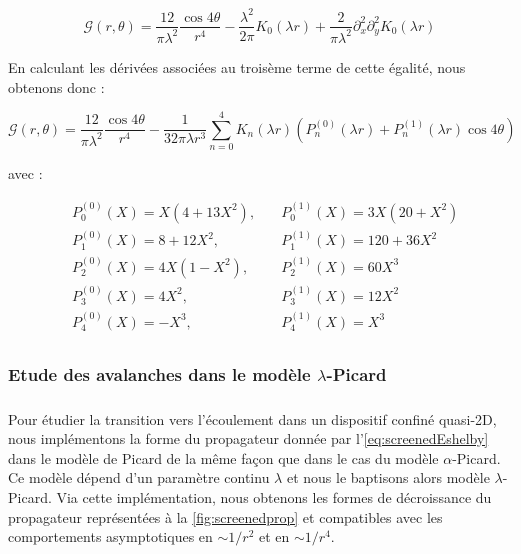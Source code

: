 \begin{equation}
    \mathcal{G}(r,\theta) = \frac{12}{\pi\lambda^2}\frac{\cos 4\theta}{r^4}-\frac{\lambda^2}{2\pi}K_0(\lambda r)+\frac{2}{\pi\lambda^2}\partial_x^2\partial_y^2K_0(\lambda r)
\end{equation}

\noindent En calculant les dérivées associées au troisème terme de cette égalité, nous obtenons donc :

\begin{equation}
    \mathcal{G}(r,\theta) = \frac{12}{\pi\lambda^2}\frac{\cos 4\theta}{r^4} - \frac{1}{32\pi\lambda r^3}\sum_{n=0}^{4}K_n(\lambda r)\left(P_n^{(0)}(\lambda r) + P_n^{(1)}(\lambda r)\cos 4\theta\right)
\end{equation}

\noindent avec :

\begin{equation}
    \begin{aligned}
        &P_0^{(0)}(X) = X(4+13X^2), \quad &P_0^{(1)}(X) = 3X(20+X^2)\\
        &P_1^{(0)}(X) = 8+12X^2,\quad &P_1^{(1)}(X) = 120+36X^2\\
        &P_2^{(0)}(X) = 4X(1-X^2),\quad &P_2^{(1)}(X) = 60X^3\\
        &P_3^{(0)}(X) = 4X^2,\quad &P_3^{(1)}(X) = 12X^2\\
        &P_4^{(0)}(X) = -X^3,\quad &P_4^{(1)}(X) = X^3\\
    \end{aligned}
\end{equation}

\subsubsection{Etude des avalanches dans le modèle $\lambda$-Picard}

\label{sec:screenedav}

\subparagraph{}Pour étudier la transition vers l'écoulement dans un dispositif confiné quasi-2D, nous implémentons la forme du propagateur donnée par l'\autoref{eq:screenedEshelby} dans le modèle de Picard de la même façon que dans le cas du modèle $\alpha$-Picard. Ce modèle dépend d'un paramètre continu $\lambda$ et nous le baptisons alors modèle $\lambda$-Picard. Via cette implémentation, nous obtenons les formes de décroissance du propagateur représentées à la \autoref{fig:screenedprop} et compatibles avec les comportements asymptotiques en $\sim 1/r^2$ et en $\sim 1/r^4$.

